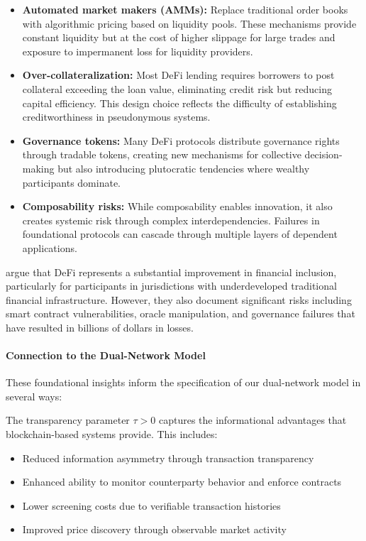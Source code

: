 \begin{itemize}
    \item \textbf{Automated market makers (AMMs):} Replace traditional order books with algorithmic pricing based on liquidity pools. These mechanisms provide constant liquidity but at the cost of higher slippage for large trades and exposure to impermanent loss for liquidity providers.
    
    \item \textbf{Over-collateralization:} Most DeFi lending requires borrowers to post collateral exceeding the loan value, eliminating credit risk but reducing capital efficiency. This design choice reflects the difficulty of establishing creditworthiness in pseudonymous systems.
    
    \item \textbf{Governance tokens:} Many DeFi protocols distribute governance rights through tradable tokens, creating new mechanisms for collective decision-making but also introducing plutocratic tendencies where wealthy participants dominate.
    
    \item \textbf{Composability risks:} While composability enables innovation, it also creates systemic risk through complex interdependencies. Failures in foundational protocols can cascade through multiple layers of dependent applications.
\end{itemize}

 argue that DeFi represents a substantial improvement in financial inclusion, particularly for participants in jurisdictions with underdeveloped traditional financial infrastructure. However, they also document significant risks including smart contract vulnerabilities, oracle manipulation, and governance failures that have resulted in billions of dollars in losses.

\paragraph{Connection to the Dual-Network Model}

These foundational insights inform the specification of our dual-network model in several ways:

The transparency parameter $\tau > 0$ captures the informational advantages that blockchain-based systems provide. This includes:
\begin{itemize}
    \item Reduced information asymmetry through transaction transparency
    \item Enhanced ability to monitor counterparty behavior and enforce contracts
    \item Lower screening costs due to verifiable transaction histories
    \item Improved price discovery through observable market activity
\end{itemize}

